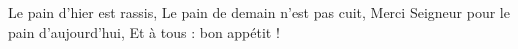 \beginverse*
Le pain d'hier est rassis, 
Le pain de demain n'est pas cuit, 
Merci Seigneur pour le pain d'aujourd'hui,
Et à tous : bon appétit !
\endverse
\endsong
